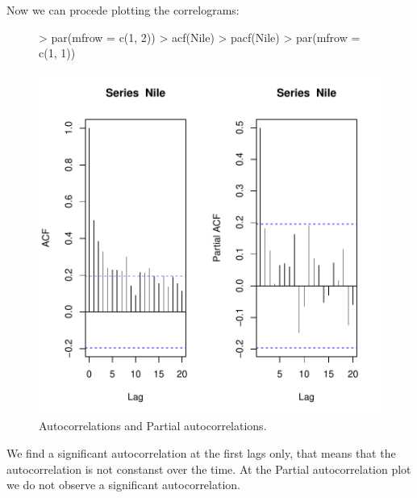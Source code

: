 \documentclass[11pt, a4paper]{article} %
\begin{document}
\noindent Now we can procede plotting the correlograms:
\begin{figure}
\centering
\begin{Schunk}
\begin{Sinput}
> par(mfrow = c(1, 2))
> acf(Nile)
> pacf(Nile)
> par(mfrow = c(1, 1))
\end{Sinput}
\end{Schunk}
\includegraphics{alles-037}
\caption{Autocorrelations and Partial autocorrelations.}
\end{figure}

\noindent We find a significant autocorrelation at the first lags only, that means that the autocorrelation is not constanst over the time. 
At the Partial autocorrelation plot we do not observe a significant autocorrelation. 
\end{document}
